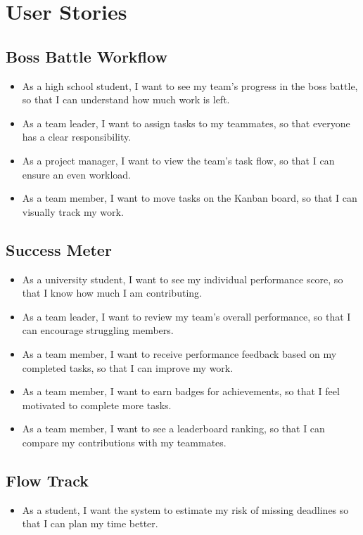 \section{User Stories}
\label{section:user-stories}

\subsection{Boss Battle Workflow}
\begin{itemize}
    \item As a high school student, I want to see my team’s progress in the boss battle, so that I can understand how much work is left.
    \item As a team leader, I want to assign tasks to my teammates, so that everyone has a clear responsibility.
    \item As a project manager, I want to view the team’s task flow, so that I can ensure an even workload.
    \item As a team member, I want to move tasks on the Kanban board, so that I can visually track my work.
\end{itemize}

\subsection{Success Meter}
\begin{itemize}
    \item As a university student, I want to see my individual performance score, so that I know how much I am contributing.
    \item As a team leader, I want to review my team’s overall performance, so that I can encourage struggling members.
    \item As a team member, I want to receive performance feedback based on my completed tasks, so that I can improve my work.
    \item As a team member, I want to earn badges for achievements, so that I feel motivated to complete more tasks.
    \item As a team member, I want to see a leaderboard ranking, so that I can compare my contributions with my teammates.
\end{itemize}

\subsection{Flow Track}
\begin{itemize}
    \item As a student, I want the system to estimate my risk of missing deadlines so that I can plan my time better.
\end{itemize}

